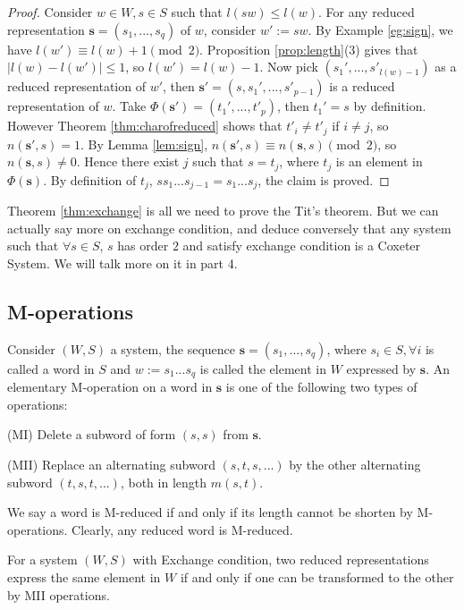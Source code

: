  \begin{proof}
     Consider $w\in W,s \in S$ such that $l(sw) \le l(w)$. For any reduced representation $\mathbf{s}=(s_1,...,s_q)$ of $w$, consider $w':=sw$. By Example \ref{eg:sign}, we have $l(w') \equiv l(w)+1\pmod{2}$. Proposition \ref{prop:length}(3) gives that $|l(w)-l(w')|\le1$, so $l(w')=l(w)-1$. Now pick $(s_1',...,s'_{l(w)-1})$ as a reduced representation of $w'$, then $\mathbf{s'}=(s,s_1',...,s'_{p-1})$ is a reduced representation of $w$. Take $\Phi(\mathbf{s'})=(t_1',...,t'_p)$, then $t_1'=s$ by definition. However Theorem \ref{thm:charofreduced} shows that $t'_i \ne t'_j$ if $i\ne j$, so $n(\mathbf{s'},s)=1$. By Lemma \ref{lem:sign}, $n(\mathbf{s'},s) \equiv n(\mathbf{s},s)\pmod{2}$, so $n(\mathbf{s},s) \ne 0$. Hence there exist $j$ such that $s=t_j$, where $t_j$ is an element in $\Phi(\mathbf{s})$. By definition of $t_j$, $ss_1...s_{j-1}=s_1...s_j$, the claim is proved.
 \end{proof}


Theorem \ref{thm:exchange} is all we need to prove the Tit's theorem. But we can actually say more on exchange condition, and deduce conversely that any system such that $\forall s\in S$, $s$ has order $2$ and satisfy exchange condition is a Coxeter System. We will talk more on it in part 4.

\subsection{M-operations}
\begin{definition}
    Consider $(W,S)$ a system, the sequence $\mathbf{s}=(s_1,...,s_q)$, where $s_i \in S,\forall i$ is called a word in $S$ and $w:=s_1...s_q$ is called the element in $W$ expressed by $\mathbf{s}$. An elementary M-operation on a word in $\mathbf{s}$ is one of the following two types of operations:

(MI) Delete a subword of form $(s,s)$ from $\mathbf{s}$.

(MII) Replace an alternating subword $(s,t,s,...)$ by the other alternating subword $(t,s,t,...)$, both in length $m(s,t)$.

We say a word is M-reduced if and only if its length cannot be shorten by M-operations. Clearly, any reduced word is M-reduced.
\end{definition} 

\begin{lemma}
    For a system $(W,S)$ with Exchange condition, two reduced representations express the same element in $W$ if and only if one can be transformed to the other by MII operations.

\end{lemma} 

